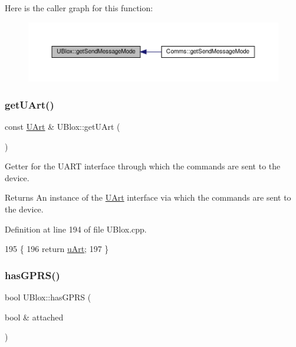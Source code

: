 Here is the caller graph for this function\+:\nopagebreak
\begin{figure}[H]
\begin{center}
\leavevmode
\includegraphics[width=350pt]{da/df6/class_u_blox_aee30d82dcf52335d19f77e766db78ab4_icgraph}
\end{center}
\end{figure}
\mbox{\label{class_u_blox_a8c5180db80a49a194bab2baa7fb74bb2}} 
\subsubsection{\texorpdfstring{get\+U\+Art()}{getUArt()}}
{\footnotesize\ttfamily const \hyperlink{class_u_art}{U\+Art} \& U\+Blox\+::get\+U\+Art (\begin{DoxyParamCaption}{ }\end{DoxyParamCaption})}

Getter for the U\+A\+RT interface through which the commands are sent to the device.

\begin{DoxyReturn}{Returns}
An instance of the \hyperlink{class_u_art}{U\+Art} interface via which the commands are sent to the device. 
\end{DoxyReturn}


Definition at line 194 of file U\+Blox.\+cpp.


\begin{DoxyCode}
195 \{
196     \textcolor{keywordflow}{return} \hyperlink{class_u_blox_a034c0463d1c199d094d657c8ebb151e8}{uArt};
197 \}
\end{DoxyCode}
\mbox{\label{class_u_blox_a4f5a31b4ddda664b255ce3f63e9ffac7}} 
\subsubsection{\texorpdfstring{has\+G\+P\+R\+S()}{hasGPRS()}}
{\footnotesize\ttfamily bool U\+Blox\+::has\+G\+P\+RS (\begin{DoxyParamCaption}\item[{bool \&}]{attached }\end{DoxyParamCaption})}

